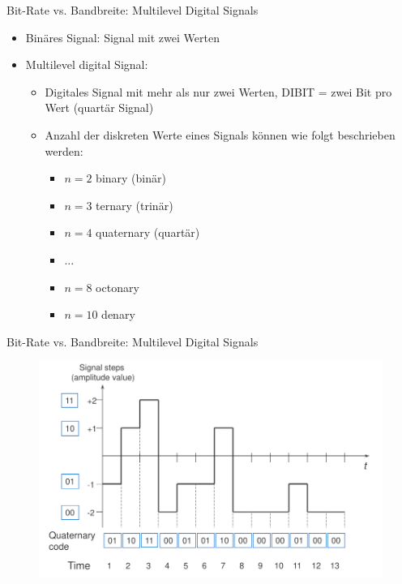 \documentclass[xcolor=dvipsnames,aspectratio=169]{beamer}
\begin{document}
\begin{frame}{Bit-Rate vs. Bandbreite: Multilevel Digital Signals}
\begin{itemize}
	\item Binäres Signal: Signal mit zwei Werten
	\item Multilevel digital Signal:
	\begin{itemize}
		\item Digitales Signal mit mehr als nur zwei Werten, DIBIT = zwei Bit pro Wert (quartär Signal)
		\item Anzahl der diskreten Werte eines Signals können wie folgt beschrieben werden:
		\begin{itemize}
			\item $n=2$ binary (binär)
			\item $n=3$ ternary (trinär)
			\item $n=4$ quaternary (quartär)
			\item ...
			\item $n=8$ octonary
			\item $n = 10$ denary
		\end{itemize}
	\end{itemize}
\end{itemize}
\end{frame}

\begin{frame}{Bit-Rate vs. Bandbreite: Multilevel Digital Signals}
\vspace*{-.7cm}
\begin{figure}
\centering
\includegraphics[scale=0.3]{bsp3}
\end{figure}
\end{frame}
\end{document}
